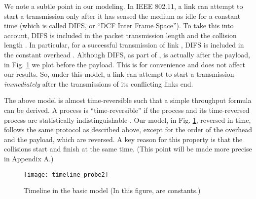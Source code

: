 \documentclass{IEEEtran}
\begin{document}
We note a subtle point in our modeling. In IEEE 802.11, a link can
attempt to start a transmission only after it has sensed the medium
as idle for a constant time (which is called DIFS, or {}``DCF Inter
Frame Space''). To take this into account, DIFS is included in the
packet transmission length  and the collision length .
In particular, for a successful transmission of link , DIFS is
included in the constant overhead . Although DIFS, as part
of , is actually after the payload, in Fig. \ref{fig:basic-model}
we plot  before the payload. This is for convenience and does
not affect our results. So, under this model, a link can attempt to
start a transmission \emph{immediately} after the transmissions of
its conflicting links end.

The above model is almost time-reversible such that a simple throughput
formula can be derived. A process is {}``time-reversible'' if the
process and its time-reversed process are statistically indistinguishable
\cite{Kelly-book}. Our model, in Fig. \ref{fig:basic-model}, reversed
in time, follows the same protocol as described above, except for
the order of the overhead and the payload, which are reversed. A key
reason for this property is that the collisions start and finish at
the same time. (This point will be made more precise in Appendix A.)

\begin{figure}
\begin{centering}
\texttt{[image: timeline\_probe2]}
\par\end{centering}

\caption{\label{fig:basic-model}Timeline in the basic model (In this figure,
 are constants.)}



\end{figure}
\end{document}
